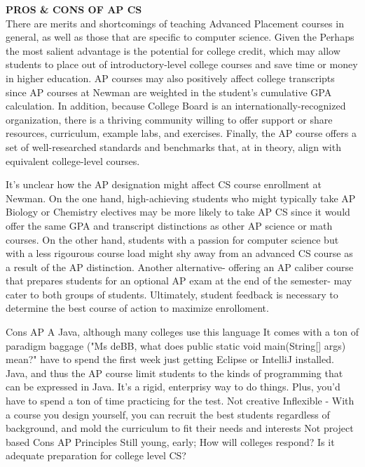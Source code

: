 \textbf{PROS \& CONS OF AP CS} \\
There are merits and shortcomings of teaching Advanced Placement courses in general, as well as those that are specific to computer science. Given the 
Perhaps the most salient advantage is the potential for college credit, which may allow students to place out of introductory-level college courses and save time or money in higher education. AP courses may also positively affect college transcripts since AP courses at Newman are weighted in the student’s cumulative GPA calculation. In addition, because College Board is an internationally-recognized organization, there is a thriving community willing to offer support or share resources, curriculum, example labs, and exercises. Finally, the AP course offers a set of well-researched standards and benchmarks that, at in theory, align with equivalent college-level courses. \par
It's unclear how the AP designation might affect CS course enrollment at Newman. On the one hand, high-achieving students who might typically take AP Biology or Chemistry electives may be more likely to take AP CS since it would offer the same GPA and transcript distinctions as other AP science or math courses. On the other hand, students with a passion for computer science but with a less rigourous course load might shy away from an advanced CS course as a result of the AP distinction. Another alternative- offering an AP caliber course that prepares students for an optional AP exam at the end of the semester- may cater to both groups of students. Ultimately, student feedback is necessary to determine the best course of action to maximize enrolloment. \par
Cons AP A
Java, although many colleges use this language
It comes with a ton of paradigm baggage ("Ms deBB, what does public static void main(String[] args) mean?"
have to spend the first week just getting Eclipse or IntelliJ installed.
Java, and thus the AP course limit students to the kinds of programming that can be expressed in Java. It's a rigid, enterprisy way to do things.
Plus, you'd have to spend a ton of time practicing for the test.
Not creative
Inflexible - With a course you design yourself, you can recruit the best students regardless of background, and mold the curriculum to fit their needs and interests
Not project based
Cons AP Principles
 Still young, early; 
How will colleges respond? Is it adequate preparation for college level CS?



